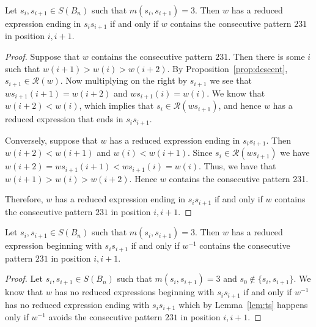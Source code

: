 \begin{lemma}\label{lem:ts}
Let $s_i,s_{i+1} \in S(B_n)$ such that $m(s_i,s_{i+1})=3$. Then $w$ has a reduced expression ending in $s_is_{i+1}$ if and only if $w$ contains the consecutive pattern $231$ in position $i, i+1$.
\begin{proof}	
	Suppose that $w$ contains the consecutive pattern $231$. Then there is some $i$ such that $w(i+1)>w(i)>w(i+2)$. By Proposition~\ref{prop:descent}, $s_{i+1} \in \mathcal{R}(w)$. Now multiplying on the right by $s_{i+1}$ we see that $ws_{i+1}(i+1)=w(i+2)$ and $ws_{i+1}(i)=w(i)$. We know that $w(i+2)<w(i)$, which implies that $s_i \in \mathcal{R}(ws_{i+1})$, and hence $w$ has a reduced expression that ends in $s_is_{i+1}$.
	
	 Conversely, suppose that $w$ has a reduced expression ending in $s_is_{i+1}$. Then $w(i+2)<w(i+1)$ and $w(i)<w(i+1)$. Since $s_i \in \mathcal{R}(ws_{i+1})$ we have $w(i+2)=ws_{i+1}(i+1)<ws_{i+1}(i)=w(i)$. Thus, we have that $w(i+1) > w(i) > w(i+2)$. Hence $w$ contains the consecutive pattern 231.
	
	Therefore, $w$ has a reduced expression ending in $s_is_{i+1}$ if and only if $w$ contains the consecutive pattern $231$ in position $i, i+1$.
\end{proof}	
\end{lemma}

\begin{corollary}\label{lem:endswithst}
	Let $s_i,s_{i+1} \in S(B_n)$ such that $m(s_i,s_{i+1})=3$. Then $w$ has a reduced expression beginning with $s_is_{i+1}$ if and only if $w^{-1}$ contains the consecutive pattern $231$ in position $i, i+1$.
	\begin{proof}
		Let $s_i,s_{i+1} \in S(B_n)$ such that $m(s_i,s_{i+1})=3$ and $s_0 \notin\{s_i,s_{i+1}\}$. We know that $w$ has no reduced expressions beginning with $s_is_{i+1}$ if and only if $w^{-1}$ has no reduced expression ending with $s_is_{i+1}$ which by Lemma~\ref{lem:ts} happens only if $w^{-1}$ avoids the consecutive pattern $231$ in position $i, i+1$. 
	\end{proof}
\end{corollary}

